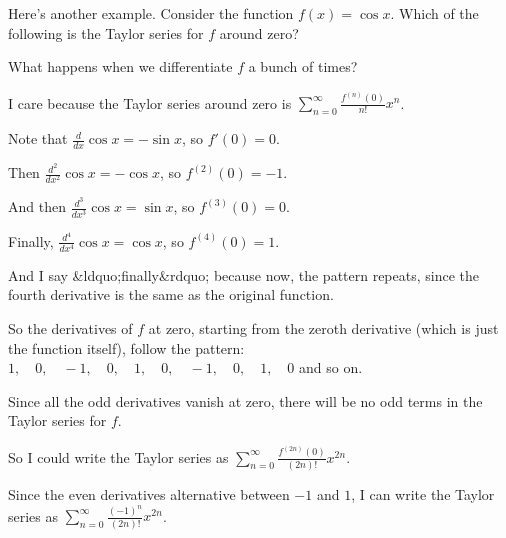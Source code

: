 \documentclass{ximera}
\begin{document}
            \begin{question}
              Here's another example.  Consider the function \(f(x) = \cos x\).  Which of the following is the Taylor series for \(f\) around zero?
              \begin{solution}
                \begin{hint}
                  What happens when we differentiate \(f\) a bunch of times?
                \end{hint}
                \begin{hint}
                  I care because the Taylor series around zero is \(\displaystyle\sum_{n=0}^\infty \displaystyle\frac{f^{(n)}(0)}{n!} x^n\).
                \end{hint}
                \begin{hint}
                  Note that \(\displaystyle\frac{d}{dx}\cos x = -\sin x\), so \(f'(0) = 0\).
                \end{hint}
                \begin{hint}
                  Then \(\displaystyle\frac{d^2}{dx^2}\cos x = -\cos x\), so \(f^{(2)}(0) = -1\).
                \end{hint}
                \begin{hint}
                  And then \(\displaystyle\frac{d^3}{dx^3}\cos x = \sin x\), so \(f^{(3)}(0) = 0\).
                \end{hint}
                \begin{hint}
                  Finally, \(\displaystyle\frac{d^4}{dx^4}\cos x = \cos x\), so \(f^{(4)}(0) = 1\).
                \end{hint}
                \begin{hint}
                  And I say &ldquo;finally&rdquo; because now, the pattern repeats, since the fourth derivative is the same as the original function.
                \end{hint}
                \begin{hint}
                  So the derivatives of \(f\) at zero, starting from the zeroth derivative (which is just the function itself), follow the pattern: \(1,\quad 0,\quad -1,\quad 0,\quad 1,\quad 0,\quad -1,\quad 0,\quad 1,\quad 0\) and so on.
                \end{hint}
                \begin{hint}
                  Since all the odd derivatives vanish at zero, there will be no odd terms in the Taylor series for \(f\).
                \end{hint}
                \begin{hint}
                  So I could write the Taylor series as \(\displaystyle\sum_{n=0}^\infty \displaystyle\frac{f^{(2n)}(0)}{(2n)!} x^{2n}\).
                \end{hint}
                \begin{hint}
                  Since the even derivatives alternative between \(-1\) and \(1\), I can write the Taylor series as \(\displaystyle\sum_{n=0}^\infty \displaystyle\frac{(-1)^n}{(2n)!} x^{2n}\).


\end{hint}
\end{solution}
\end{question}
\end{document}
